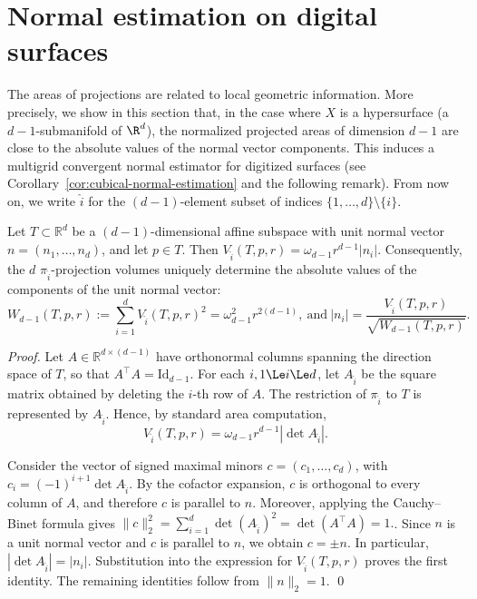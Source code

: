 \section{Normal estimation on digital surfaces}

The areas of projections are related to local geometric
information. More precisely, we show in this section that, in the case
where $X$ is a hypersurface (a $d-1$-submanifold of $\R^d$), the
normalized projected areas of dimension $d-1$ are close to the
absolute values of the normal vector components. This induces a
multigrid convergent normal estimator for digitized surfaces (see
Corollary~\ref{cor:cubical-normal-estimation} and the following
remark). From now on, we write $\widehat{i}$ for the $(d-1)$-element subset of
indices $\{1,\ldots,d\} \setminus \{ i \}$.

\begin{theorem}
\label{thm:normal-recovery}
Let $T\subset\mathbb R^d$ be a $(d-1)$-dimensional affine subspace
with unit normal vector $n=(n_1,\ldots,n_d)$, and let $p \in T$.
Then \( V_{\widehat{i}}(T,p,r)=\omega_{d-1}r^{d-1}|n_i|. \)
Consequently, the $d$ $\pi_{\widehat{i}}$-projection volumes uniquely
determine the absolute values of the components
of the unit normal vector:
\[
W_{d-1}(T,p,r) := \sum_{i=1}^d V_{\widehat{i}}(T,p,r)^2
=
\omega_{d-1}^2r^{2(d-1)},
~\text{and}~
|n_i|=\frac{V_{\widehat{i}}(T,p,r)}
{\sqrt{W_{d-1}(T,p,r)}}.
\]
\end{theorem}

\begin{proof}
Let $A\in\mathbb R^{d\times(d-1)}$ have orthonormal columns spanning
the direction space of $T$, so that $A^\top A=\mathrm{Id}_{d-1}$.  For each $i, 1\Le i \Le
d$, let $A_{\widehat i}$ be the square matrix obtained by deleting the
$i$-th row of $A$.  The restriction of $\pi_{\widehat i}$ to $T$ is
represented by $A_{\widehat i}$.  Hence, by standard area computation, 
\[
V_{\widehat{i}}(T,p,r)=\omega_{d-1}r^{d-1}|\det A_{\widehat i}|.
\]

\begin{sloppypar}
Consider the vector of signed maximal minors $c=(c_1,\ldots,c_d)$,
with $c_i = (-1)^{i+1} \det A_{\widehat i}$.  By the cofactor expansion,
$c$ is orthogonal to every column of $A$, and therefore $c$ is
parallel to $n$.
Moreover, applying the Cauchy--Binet formula gives
\(
\|c\|_2^2
=
\sum_{i=1}^d\det(A_{\widehat i})^2
=
\det(A^\top A)=1.
\).
Since $n$ is a unit normal vector and $c$ is parallel to $n$, we obtain
$c=\pm n$. In particular,
\(
|\det A_{\widehat i}|=|n_i|.
\)
Substitution into the expression for $V_{\widehat{i}}(T,p,r)$
proves the first identity. The remaining
identities follow from $\|n\|_2=1$. \qed
\end{sloppypar}
\end{proof}



